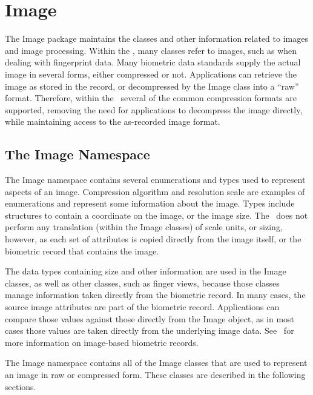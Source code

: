 %
%
\chapter{Image}
\label{chp-image}

The Image package maintains the classes and other information related to images
and image processing. Within the \lname, many classes refer to images, such as
when dealing with fingerprint data. Many biometric data standards supply the
actual image in several forms, either compressed or not. Applications can
retrieve the image as stored in the record, or decompressed by the Image class
into a ``raw'' format. Therefore, within the \sname\ several of the common
compression formats are supported, removing the need for applications to
decompress the image directly, while maintaining access to the as-recorded
image format.

\section{The Image Namespace}
\label{sec-imagenamespace}
The Image namespace contains several enumerations and types used to represent
aspects of an image. Compression algorithm and resolution scale are examples
of enumerations and represent some information about the image. Types include
structures to contain a coordinate on the image, or the image size. The
\sname\ does not perform any translation (within the Image classes) of scale
units, or sizing, however, as each set of attributes is copied directly from
the image itself, or the biometric record that contains the image.

The data types containing size and other information are used in the Image
classes, as well as other classes, such as finger views, because those classes
manage information taken directly from the biometric record. In many cases, the
source image attributes are part of the biometric record. Applications can
compare those values against those directly from the Image object, as in most
cases those values are taken directly from the underlying image data.
See~ for more information on image-based biometric records.

The Image namespace contains all of the Image classes that are used to
represent an image in raw or compressed form. These classes are described in
the following sections.

